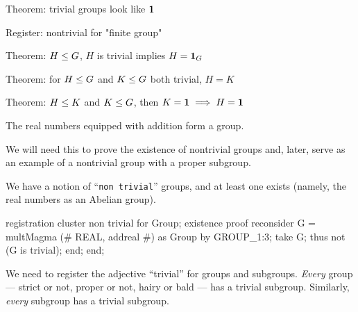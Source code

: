 \LA{}Theorem: trivial groups look like $\mathbf{1}$~{\nwtagstyle{}}\RA{}

\LA{}Register: nontrivial for "finite group"~{\nwtagstyle{}}\RA{}

\LA{}Theorem: $H\leq G$, $H$ is trivial implies $H=\mathbf{1}_{G}$~{\nwtagstyle{}}\RA{}

\LA{}Theorem: for $H\leq G$ and $K\leq G$ both trivial, $H=K$~{\nwtagstyle{}}\RA{}

\LA{}Theorem: $H\leq K$ and $K\leq G$, then $K=\mathbf{1}\implies H=\mathbf{1}$~{\nwtagstyle{}}\RA{}
\nwendcode{}\nwdocspar

\begin{proposition}
The real numbers equipped with addition form a group.
\end{proposition}

\begin{remark}
We will need this to prove the existence of nontrivial groups and, later,
serve as an example of a nontrivial group with a proper subgroup.
\end{remark}

\begin{registration}
We have a notion of ``\texttt{non trivial}'' groups, and at least one
exists (namely, the real numbers as an Abelian group).
\end{registration}

\nwenddocs{}\endmoddef\nwstartdeflinemarkup{}\nwenddeflinemarkup
registration
  cluster non trivial for Group;
  existence
  proof
    reconsider G = multMagma (# REAL, addreal #) as Group by GROUP_1:3;
    take G;
    thus not (G is trivial);
  end;
end;
\eatline
{}\nwendcode{}\nwdocspar
\begin{registration}
We need to register the adjective ``trivial'' for groups and
subgroups. \emph{Every} group --- strict or not, proper or not, hairy
or bald --- has a trivial subgroup. Similarly, \emph{every} subgroup has
a trivial subgroup.
\end{registration}

